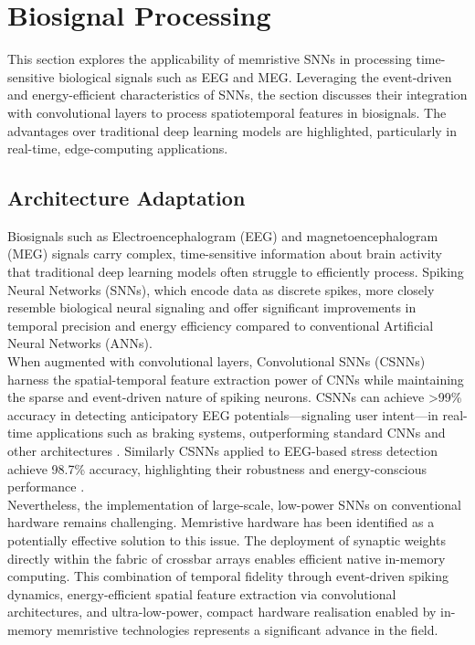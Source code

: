 \section[Biosignal Processing]{Biosignal Processing}

This section explores the applicability of memristive SNNs in processing time-sensitive biological signals such as EEG and MEG. Leveraging the event-driven and energy-efficient characteristics of SNNs, the section discusses their integration with convolutional layers to process spatiotemporal features in biosignals. The advantages over traditional deep learning models are highlighted, particularly in real-time, edge-computing applications.

\subsection{Architecture Adaptation}

Biosignals such as Electroencephalogram (EEG) and magnetoencephalogram (MEG) signals carry complex, time-sensitive information about brain activity that traditional deep learning models often struggle to efficiently process. Spiking Neural Networks (SNNs), which encode data as discrete spikes, more closely resemble biological neural signaling and offer significant improvements in temporal precision and energy efficiency compared to conventional Artificial Neural Networks (ANNs).\\

\noindent When augmented with convolutional layers, Convolutional SNNs (CSNNs) harness the spatial-temporal feature extraction power of CNNs while maintaining the sparse and event-driven nature of spiking neurons. CSNNs can achieve >99\% accuracy in detecting anticipatory EEG potentials—signaling user intent—in real-time applications such as braking systems, outperforming standard CNNs and other architectures \cite{lutes2024convolutional}. Similarly CSNNs applied to EEG-based stress detection achieve 98.7\% accuracy, highlighting their robustness and energy-conscious performance \cite{Joshi2025-sa}. \\

\noindent Nevertheless, the implementation of large-scale, low-power SNNs on conventional hardware remains challenging. Memristive hardware has been identified as a potentially effective solution to this issue. The deployment of synaptic weights directly within the fabric of crossbar arrays enables efficient native in-memory computing. This combination of temporal fidelity through event-driven spiking dynamics, energy-efficient spatial feature extraction via convolutional architectures, and ultra-low-power, compact hardware realisation enabled by in-memory memristive technologies represents a significant advance in the field.\\

